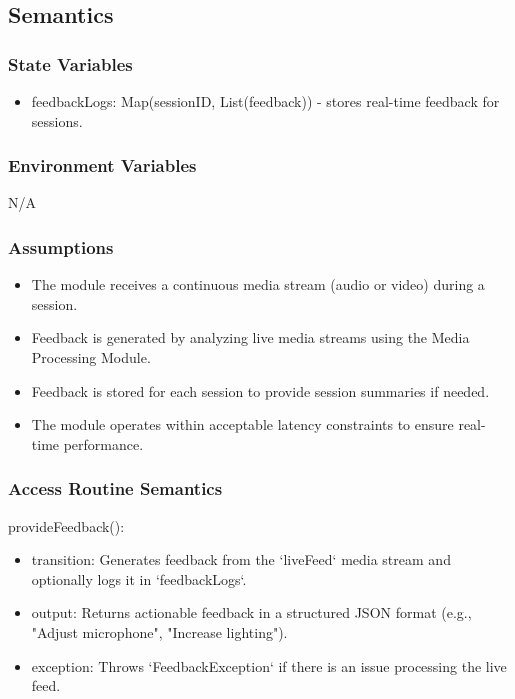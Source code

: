 \documentclass[12pt, titlepage]{article}
\begin{document}
\subsection{Semantics}

\subsubsection{State Variables}

\begin{itemize}
\item feedbackLogs: Map(sessionID, List(feedback)) - stores real-time feedback for sessions.
\end{itemize}

\subsubsection{Environment Variables}

N/A

\subsubsection{Assumptions}

\begin{itemize}
\item The module receives a continuous media stream (audio or video) during a session.
\item Feedback is generated by analyzing live media streams using the Media Processing Module.
\item Feedback is stored for each session to provide session summaries if needed.
\item The module operates within acceptable latency constraints to ensure real-time performance.
\end{itemize}

\subsubsection{Access Routine Semantics}

\noindent provideFeedback():
\begin{itemize}
\item transition: Generates feedback from the `liveFeed` media stream and optionally logs it in `feedbackLogs`.
\item output: Returns actionable feedback in a structured JSON format (e.g., "Adjust microphone", "Increase lighting").
\item exception: Throws `FeedbackException` if there is an issue processing the live feed.
\end{itemize}
\end{document}
